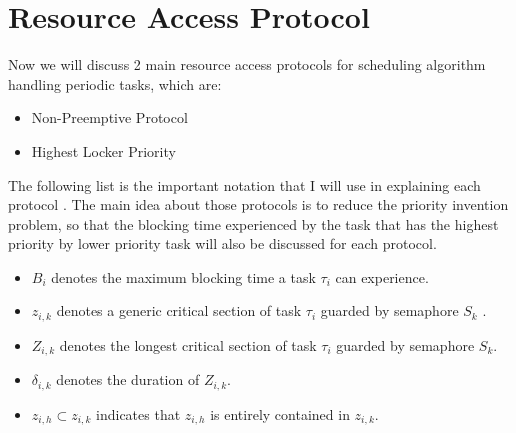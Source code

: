 \section{Resource Access Protocol}

Now we will discuss 2 main resource access protocols for scheduling algorithm handling periodic tasks, which are:

\begin{itemize}
\item Non-Preemptive Protocol
\item Highest Locker Priority
\end{itemize}

 The following list is the important notation that I will use in explaining each protocol \cite{b5}. The main idea about those protocols is to reduce the priority invention problem, so that the blocking time experienced by the task that has the highest priority by lower priority task will also be discussed for each protocol.

\begin{itemize}
\item $ B_{i} $ denotes the maximum blocking time a task $ \tau_{i} $ can experience.
\item $ z_{i,k} $ denotes a generic critical section of task $ \tau_{i} $ guarded by semaphore $ S_{k} $ .
\item  $ Z_{i,k} $ denotes the longest critical section of task $ \tau_{i} $ guarded by semaphore $ S_{k} $.
\item $ \delta_{i,k} $ denotes the duration of $ Z_{i,k} $.
\item $ z_{i,h} \subset z_{i,k} $ indicates that $ z_{i,h} $ is entirely contained in $ z_{i,k} $.
\end{itemize}





